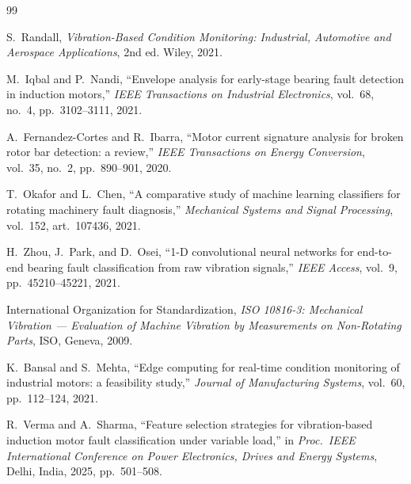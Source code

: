 \documentclass[12pt,a4paper]{report}
\begin{document}
\begin{thebibliography}{99}

 S.\ Randall, \emph{Vibration-Based Condition Monitoring: Industrial, Automotive
and Aerospace Applications}, 2nd ed. Wiley, 2021.

 M.\ Iqbal and P.\ Nandi, ``Envelope analysis for early-stage bearing fault
detection in induction motors,'' \emph{IEEE Transactions on Industrial Electronics}, vol.\ 68,
no.\ 4, pp.\ 3102--3111, 2021.

 A.\ Fernandez-Cortes and R.\ Ibarra, ``Motor current signature analysis for
broken rotor bar detection: a review,'' \emph{IEEE Transactions on Energy Conversion}, vol.\ 35,
no.\ 2, pp.\ 890--901, 2020.

 T.\ Okafor and L.\ Chen, ``A comparative study of machine learning classifiers
for rotating machinery fault diagnosis,'' \emph{Mechanical Systems and Signal Processing},
vol.\ 152, art.\ 107436, 2021.

 H.\ Zhou, J.\ Park, and D.\ Osei, ``1-D convolutional neural networks for
end-to-end bearing fault classification from raw vibration signals,'' \emph{IEEE Access}, vol.\
9, pp.\ 45210--45221, 2021.

 International Organization for Standardization, \emph{ISO 10816-3: Mechanical
Vibration --- Evaluation of Machine Vibration by Measurements on Non-Rotating Parts}, ISO,
Geneva, 2009.

 K.\ Bansal and S.\ Mehta, ``Edge computing for real-time condition monitoring of
industrial motors: a feasibility study,'' \emph{Journal of Manufacturing Systems}, vol.\ 60,
pp.\ 112--124, 2021.

 R.\ Verma and A.\ Sharma, ``Feature selection strategies for vibration-based
induction motor fault classification under variable load,'' in \emph{Proc.\ IEEE International
Conference on Power Electronics, Drives and Energy Systems}, Delhi, India, 2025, pp.\ 501--508.

\end{thebibliography}

\appendix
\end{document}

